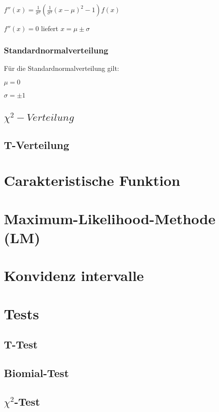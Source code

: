 \documentclass[a4paper, 11pt]{article}
\begin{document}
$f''(x) = \frac{1}{\sigma^2} (\frac{1}{\sigma^2} (x-\mu)^2 - 1) f(x)$


$f''(x) = 0 $ liefert $ x = \mu \pm \sigma$

\subsubsection{Standardnormalverteilung}
Für die Standardnormalverteilung gilt:


$\mu = 0$


$\sigma = \pm 1$

\subsection{$\chi^2-Verteilung$}
\subsection{T-Verteilung}
\section{Carakteristische Funktion}
\section{Maximum-Likelihood-Methode (LM)}
\section{Konvidenz intervalle}
\section{Tests}
\subsection{T-Test}
\subsection{Biomial-Test}
\subsection{$\chi^2$-Test}
\end{document}
